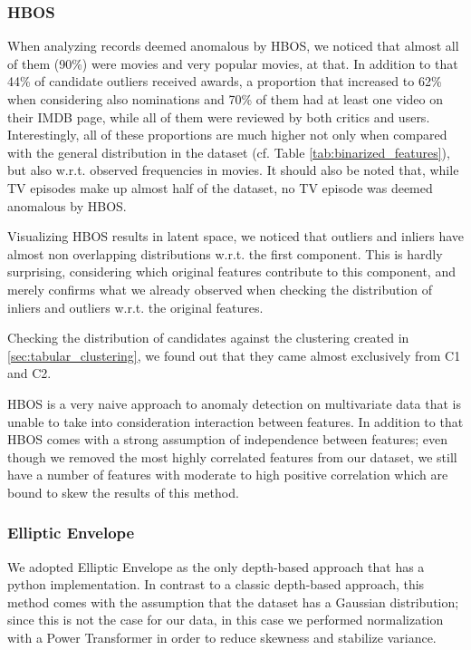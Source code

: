 \subsubsection{HBOS}
When analyzing records deemed anomalous by HBOS, we noticed that almost all of them (90\%) were movies and very popular movies, at that.
In addition to that 44\% of candidate outliers received awards, a proportion that increased to 62\% when considering also nominations and 70\% of them had at least one video on their IMDB page, while all of them were reviewed by both critics and users.
Interestingly, all of these proportions are much higher not only when compared with the general distribution in the dataset (cf. Table \ref{tab:binarized_features}), but also w.r.t. observed frequencies in movies.
It should also be noted that, while TV episodes make up almost half of the dataset, no TV episode was deemed anomalous by HBOS.

Visualizing HBOS results in latent space, we noticed that outliers and inliers have almost non overlapping distributions w.r.t. the first component.
This is hardly surprising, considering which original features contribute to this component, and merely confirms what we already observed when checking the distribution of inliers and outliers w.r.t. the original features.

Checking the distribution of candidates against the clustering created in \ref{sec:tabular_clustering}, we found out that they came almost exclusively from C1 and C2.

HBOS is a very naive approach to anomaly detection on multivariate data that is unable to take into consideration interaction between features.
In addition to that HBOS comes with a strong assumption of independence between features; even though we removed the most highly correlated features from our dataset, we still have a number of features with moderate to high positive correlation which are bound to skew the results of this method.

\subsubsection{Elliptic Envelope}
We adopted Elliptic Envelope as the only depth-based approach that has a python implementation.
In contrast to a classic depth-based approach, this method comes with the assumption that the dataset has a Gaussian distribution; since this is not the case for our data, in this case we performed normalization with a Power Transformer in order to reduce skewness and stabilize variance.

